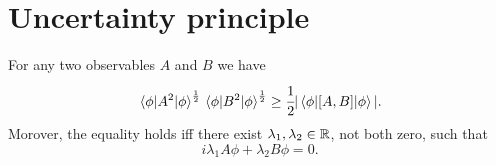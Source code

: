 \documentclass[main.tex]{subfiles}
\begin{document}
\section{Uncertainty principle}
\begin{lemma}
For any two observables $A$ and $B$ we have
\begin{equation}
\label{uncertainty-inequality}
\mel{\phi}{A^2}{\phi}^{\frac{1}{2}} \mel{\phi}{B^2}{\phi}^{\frac{1}{2}} \geq \cfrac{1}{2} |\mel{\phi}{[A,B]}{\phi}|.
\end{equation}
Morover, the equality holds iff there exist $\lambda_1, \lambda_2\in \mathbb{R}$, not both zero, such that 
\begin{equation}
\label{uncertainty-linear-condition}
i\lambda_1 A\phi + \lambda_2 B\phi = 0.
\end{equation}
\end{lemma}
\end{document}
